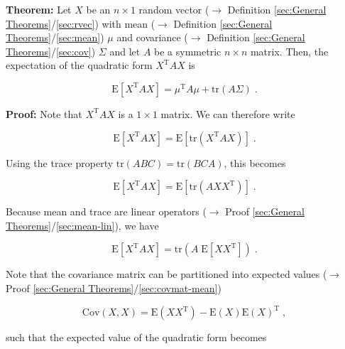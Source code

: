 \documentclass[a4paper,12pt,twoside]{book}
\begin{document}
\textbf{Theorem:} Let $X$ be an $n \times 1$ random vector ($\rightarrow$ Definition \ref{sec:General Theorems}/\ref{sec:rvec}) with mean ($\rightarrow$ Definition \ref{sec:General Theorems}/\ref{sec:mean}) $\mu$ and covariance ($\rightarrow$ Definition \ref{sec:General Theorems}/\ref{sec:cov}) $\Sigma$ and let $A$ be a symmetric $n \times n$ matrix. Then, the expectation of the quadratic form $X^\mathrm{T} A X$ is

\begin{equation} \label{eq:mean-qf-mean-qf}
\mathrm{E}\left[ X^\mathrm{T} A X \right] = \mu^\mathrm{T} A \mu + \mathrm{tr}(A \Sigma) \; .
\end{equation}


\vspace{1em}
\textbf{Proof:} Note that $X^\mathrm{T} A X$ is a $1 \times 1$ matrix. We can therefore write

\begin{equation} \label{eq:mean-qf-mean-qf-s1}
\mathrm{E}\left[ X^\mathrm{T} A X \right] =  \mathrm{E}\left[ \mathrm{tr} \left( X^\mathrm{T} A X \right) \right] \; .
\end{equation}

Using the trace property $\mathrm{tr}(ABC) = \mathrm{tr}(BCA)$, this becomes

\begin{equation} \label{eq:mean-qf-mean-qf-s2}
\mathrm{E}\left[ X^\mathrm{T} A X \right] =  \mathrm{E}\left[ \mathrm{tr} \left( A X X^\mathrm{T} \right) \right] \; .
\end{equation}

Because mean and trace are linear operators ($\rightarrow$ Proof \ref{sec:General Theorems}/\ref{sec:mean-lin}), we have

\begin{equation} \label{eq:mean-qf-mean-qf-s3}
\mathrm{E}\left[ X^\mathrm{T} A X \right] =  \mathrm{tr} \left( A \; \mathrm{E}\left[ X X^\mathrm{T} \right] \right) \; .
\end{equation}

Note that the covariance matrix can be partitioned into expected values ($\rightarrow$ Proof \ref{sec:General Theorems}/\ref{sec:covmat-mean})

\begin{equation} \label{eq:mean-qf-covmat-mean}
\mathrm{Cov}(X,X) = \mathrm{E}(X X^\mathrm{T}) - \mathrm{E}(X) \mathrm{E}(X)^\mathrm{T} \; ,
\end{equation}

such that the expected value of the quadratic form becomes
\end{document}

